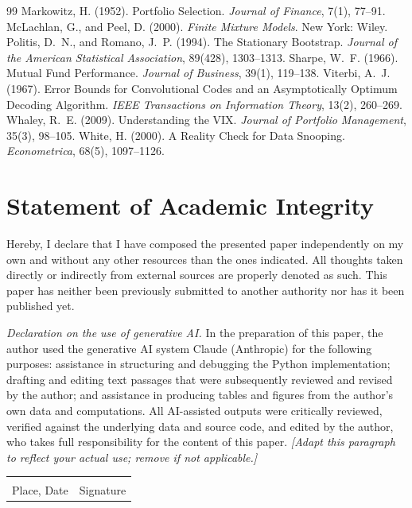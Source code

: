 \documentclass[12pt,a4paper]{article}
\begin{document}
\begin{thebibliography}{99}
 Markowitz, H. (1952). Portfolio Selection. \textit{Journal of Finance}, 7(1), 77--91.
 McLachlan, G., and Peel, D. (2000). \textit{Finite Mixture Models}. New York: Wiley.
 Politis, D.~N., and Romano, J.~P. (1994). The Stationary Bootstrap. \textit{Journal of the American Statistical Association}, 89(428), 1303--1313.
 Sharpe, W.~F. (1966). Mutual Fund Performance. \textit{Journal of Business}, 39(1), 119--138.
 Viterbi, A.~J. (1967). Error Bounds for Convolutional Codes and an Asymptotically Optimum Decoding Algorithm. \textit{IEEE Transactions on Information Theory}, 13(2), 260--269.
 Whaley, R.~E. (2009). Understanding the VIX. \textit{Journal of Portfolio Management}, 35(3), 98--105.
 White, H. (2000). A Reality Check for Data Snooping. \textit{Econometrica}, 68(5), 1097--1126.
\end{thebibliography}

\clearpage
{}
\section*{Statement of Academic Integrity}
Hereby, I declare that I have composed the presented paper independently on my own and
without any other resources than the ones indicated. All thoughts taken directly or
indirectly from external sources are properly denoted as such. This paper has neither been
previously submitted to another authority nor has it been published yet.

\vspace{0.8em}
\textit{Declaration on the use of generative AI.} In the preparation of this paper, the
author used the generative AI system Claude (Anthropic) for the following purposes:
assistance in structuring and debugging the Python implementation; drafting and editing
text passages that were subsequently reviewed and revised by the author; and assistance in
producing tables and figures from the author's own data and computations. All AI-assisted
outputs were critically reviewed, verified against the underlying data and source code, and
edited by the author, who takes full responsibility for the content of this paper.
\emph{[Adapt this paragraph to reflect your actual use; remove if not applicable.]}

\vspace{2.0cm}
\noindent\begin{tabular}{p{6cm}p{6cm}}
\hrulefill & \hrulefill \\
Place, Date & Signature \\
\end{tabular}
\end{document}

